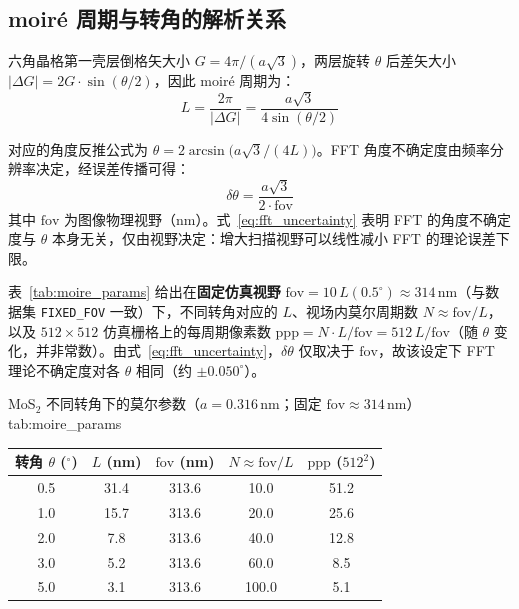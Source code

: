 \documentclass[supercite]{HustGraduPaper}
\begin{document}
\subsection{moiré 周期与转角的解析关系}

六角晶格第一壳层倒格矢大小 $G = 4\pi/(a\sqrt{3})$，两层旋转 $\theta$ 后差矢大小 $|\Delta G| = 2G\cdot\sin(\theta/2)$，因此 moiré 周期为：
\begin{equation}
  L = \frac{2\pi}{|\Delta G|} = \frac{a\sqrt{3}}{4\sin(\theta/2)}
  \label{eq:period}
\end{equation}

对应的角度反推公式为 $\theta = 2\arcsin\!\bigl(a\sqrt{3}/(4L)\bigr)$。FFT 角度不确定度由频率分辨率决定，经误差传播可得：
\begin{equation}
  \delta\theta = \frac{a\sqrt{3}}{2 \cdot \mathrm{fov}}
  \label{eq:fft_uncertainty}
\end{equation}
其中 $\mathrm{fov}$ 为图像物理视野（nm）。式~\eqref{eq:fft_uncertainty} 表明 FFT 的角度不确定度与 $\theta$ 本身无关，仅由视野决定：增大扫描视野可以线性减小 FFT 的理论误差下限。

表~\ref{tab:moire_params} 给出在\textbf{固定仿真视野} $\mathrm{fov}=10\,L(0.5^{\circ})\approx 314\,\mathrm{nm}$（与数据集 \texttt{FIXED\_FOV} 一致）下，不同转角对应的 $L$、视场内莫尔周期数 $N\approx\mathrm{fov}/L$，以及 $512\times 512$ 仿真栅格上的每周期像素数 $\mathrm{ppp}=N\cdot L/\mathrm{fov}=512\,L/\mathrm{fov}$（随 $\theta$ 变化，并非常数）。由式~\eqref{eq:fft_uncertainty}，$\delta\theta$ 仅取决于 $\mathrm{fov}$，故该设定下 FFT 理论不确定度对各 $\theta$ 相同（约 $\pm 0.050^{\circ}$）。

\begin{generaltab}{MoS$_2$ 不同转角下的莫尔参数（$a = 0.316\,\mathrm{nm}$；固定 $\mathrm{fov}\approx 314\,\mathrm{nm}$）}{tab:moire_params}
  \begin{tabularx}{\textwidth}{CCCCC}
    \toprule
    转角 $\theta$ ($^{\circ}$) & $L$ (nm) & $\mathrm{fov}$ (nm) & $N\approx\mathrm{fov}/L$ & $\mathrm{ppp}$ ($512^2$) \\
     & 31.4 & 313.6 & 10.0 & 51.2 \\
    1.0 & 15.7 & 313.6 & 20.0 & 25.6 \\
    2.0 & 7.8  & 313.6 & 40.0 & 12.8 \\
    3.0 & 5.2  & 313.6 & 60.0 & 8.5 \\
    5.0 & 3.1  & 313.6 & 100.0 & 5.1 \\
    \bottomrule
  \end{tabularx}
\end{generaltab}
\end{document}
